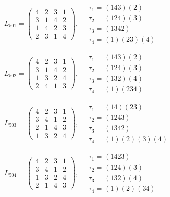 $L_{501} = \begin{pmatrix} 4 & 2 & 3 & 1 \\ 3 & 1 & 4 & 2 \\ 1 & 4 & 2 & 3 \\ 2 & 3 & 1 & 4 \end{pmatrix}, \quad \begin{matrix} \tau_{1} = (1 4 3)(2) \\ \tau_{2} = (1 2 4)(3) \\ \tau_{3} = (1 3 4 2) \\ \tau_{4} = (1)(2 3)(4) \end{matrix}$

$L_{502} = \begin{pmatrix} 4 & 2 & 3 & 1 \\ 3 & 1 & 4 & 2 \\ 1 & 3 & 2 & 4 \\ 2 & 4 & 1 & 3 \end{pmatrix}, \quad \begin{matrix} \tau_{1} = (1 4 3)(2) \\ \tau_{2} = (1 2 4)(3) \\ \tau_{3} = (1 3 2)(4) \\ \tau_{4} = (1)(2 3 4) \end{matrix}$

$L_{503} = \begin{pmatrix} 4 & 2 & 3 & 1 \\ 3 & 4 & 1 & 2 \\ 2 & 1 & 4 & 3 \\ 1 & 3 & 2 & 4 \end{pmatrix}, \quad \begin{matrix} \tau_{1} = (1 4)(2 3) \\ \tau_{2} = (1 2 4 3) \\ \tau_{3} = (1 3 4 2) \\ \tau_{4} = (1)(2)(3)(4) \end{matrix}$

$L_{504} = \begin{pmatrix} 4 & 2 & 3 & 1 \\ 3 & 4 & 1 & 2 \\ 1 & 3 & 2 & 4 \\ 2 & 1 & 4 & 3 \end{pmatrix}, \quad \begin{matrix} \tau_{1} = (1 4 2 3) \\ \tau_{2} = (1 2 4)(3) \\ \tau_{3} = (1 3 2)(4) \\ \tau_{4} = (1)(2)(3 4) \end{matrix}$

